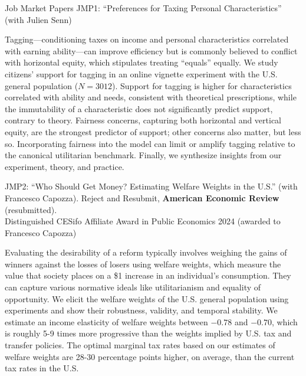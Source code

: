 \documentclass{resume} %
\begin{document}

\begin{rSection}{Job Market Papers}
  JMP1:  ``Preferences for Taxing Personal Characteristics'' (with Julien Senn)

Tagging---conditioning taxes on income and personal characteristics correlated with earning ability---can improve efficiency but is commonly believed to conflict with horizontal equity, which stipulates treating ``equals'' equally. We study citizens' support for tagging in an online vignette experiment with the U.S. general population ($N=3012$). Support for tagging is higher for characteristics correlated with ability and needs, consistent with theoretical prescriptions, while the immutability of a characteristic does not significantly predict support, contrary to theory. Fairness concerns, capturing both horizontal and vertical equity, are the strongest predictor of support; other concerns also matter, but less so. Incorporating fairness into the model can limit or amplify tagging relative to the canonical utilitarian benchmark. Finally, we synthesize insights from our experiment, theory, and practice.

JMP2:   ``Who Should Get Money? Estimating Welfare Weights in the U.S.'' (with Francesco Capozza). Reject and Resubmit, \textbf{American Economic Review} (resubmitted). \\ \vspace{0.6em}
  { \normalsize  \hspace*{0.6em} Distinguished CESifo Affiliate Award in Public Economics 2024 (awarded to Francesco Capozza)} 

Evaluating the desirability of a reform typically involves weighing the gains of winners against the losses of losers using welfare weights, which measure the value that society places on a \$1 increase in an individual's consumption. They can capture various normative ideals like utilitarianism and equality of opportunity. We elicit the welfare weights of the U.S. general population using experiments and show their robustness, validity, and temporal stability. We estimate an income elasticity of welfare weights between $-0.78$ and $-0.70$, which is roughly 5-9 times more progressive than the weights implied by U.S. tax and transfer policies. The optimal marginal tax rates based on our estimates of welfare weights are 28-30 percentage points higher, on average, than the current tax rates in the U.S.
\end{rSection}
\end{document}

